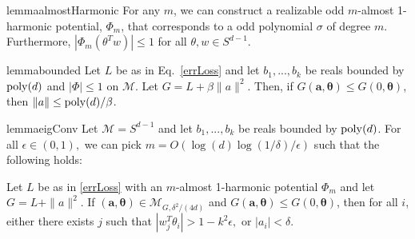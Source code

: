 \begin{restatable}{lemma}{almostHarmonic}\label{AlmostHarmonic}
For any $m$, we can construct a realizable odd $m$-almost 1-harmonic potential, $\Phi_m$, that corresponds to a odd polynomial $\sigma$ of degree $m$. Furthermore, $|\Phi_m(\theta^Tw)|\leq 1$ for all $\theta, w \in S^{d-1}$.
\end{restatable} 
%
%
\begin{restatable}{lemma}{bounded}
\label{bounded}
  Let $L$ be as in Eq.~\eqref{errLoss} and let $b_1,...,b_k$ be reals
  bounded by $\mathrm{poly}(d)$ and $|\Phi|\leq 1$ on $\mathcal{M}$. Let
  $G = L + \beta\|a\|^2$. Then, if
  $G(\boldsymbol{a,\theta}) \leq G(0,\boldsymbol{\theta})$, then
  $\|a\| \leq \mathrm{poly}(d)/\beta$.
\end{restatable}
%
%
\begin{restatable}{lemma}{eigConv}
\label{eigConv}
Let $\mathcal{M} = S^{d-1}$ and let $b_1,...,b_k$ be reals bounded by
$\mathrm{poly}(d)$. For all $\epsilon \in (0,1),$ we can pick
$m = O(\log(d)\log(1/\delta)/\epsilon)$ such that the following holds:

Let $L$ be as in \eqref{errLoss} with an $m$-almost 1-harmonic
potential $\Phi_m$ and let $G = L + \|a\|^2$.  If
$(\boldsymbol{a,\theta}) \in \mathcal{M}_{G, \delta^2 / (4d)}$ and
$G(\boldsymbol{a,\theta}) \leq G(0,\boldsymbol{\theta})$, then for all
$i$, either there exists $j$ such that
$|w_j^T\theta_i| > 1- k^2\epsilon,$ or $|a_i| < \delta$.
\end{restatable}
%
